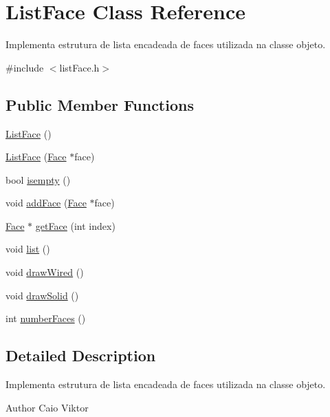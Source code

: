 \hypertarget{class_list_face}{\section{List\-Face Class Reference}
\label{class_list_face}
}


Implementa estrutura de lista encadeada de faces utilizada na classe objeto.  




{\ttfamily \#include $<$list\-Face.\-h$>$}

\subsection*{Public Member Functions}
\begin{DoxyCompactItemize}
\item 
\hyperlink{class_list_face_a272e3b9dfa08a4f26dd150b871610f84}{List\-Face} ()
\item 
\hyperlink{class_list_face_a870627eab83b4523016d508a3cb8fd7b}{List\-Face} (\hyperlink{class_face}{Face} $\ast$face)
\item 
bool \hyperlink{class_list_face_a6aec2173f93b4c4f53c4f410d8349198}{isempty} ()
\item 
void \hyperlink{class_list_face_a29c8972a6bb03ba6d92fb4a841ce2b7e}{add\-Face} (\hyperlink{class_face}{Face} $\ast$face)
\item 
\hyperlink{class_face}{Face} $\ast$ \hyperlink{class_list_face_ae9dcb7e7508e87b874bc22630fc86ce0}{get\-Face} (int index)
\item 
void \hyperlink{class_list_face_a41765d37857ae399e30f65250010ade6}{list} ()
\item 
void \hyperlink{class_list_face_a846fdac36dc1aa7dbc5365a6929bc07e}{draw\-Wired} ()
\item 
void \hyperlink{class_list_face_a991b8a2f2ba9b338591db9ca8b7e7f27}{draw\-Solid} ()
\item 
int \hyperlink{class_list_face_af94f2d60855574140e7fb46ac16428e8}{number\-Faces} ()
\end{DoxyCompactItemize}


\subsection{Detailed Description}
Implementa estrutura de lista encadeada de faces utilizada na classe objeto. 

\begin{DoxyAuthor}{Author}
Caio Viktor 
\end{DoxyAuthor}


